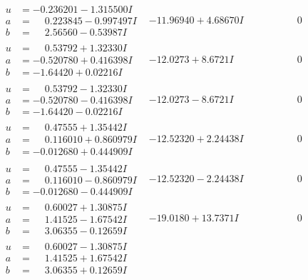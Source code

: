 \documentclass[1p]{elsarticle_modified}
\theoremstyle{definition}
\begin{document}
$$\begin{array}{c|c|c}
\begin{aligned}
u &= -0.236201 - 1.315500 I \\
a &= \phantom{-}0.223845 - 0.997497 I \\
b &= \phantom{-}2.56560 - 0.53987 I\end{aligned}
 & -11.96940 + 4.68670 I & \phantom{-0.000000 } 0 \\ \hline\begin{aligned}
u &= \phantom{-}0.53792 + 1.32330 I \\
a &= -0.520780 + 0.416398 I \\
b &= -1.64420 + 0.02216 I\end{aligned}
 & -12.0273 + 8.6721 I & \phantom{-0.000000 } 0 \\ \hline\begin{aligned}
u &= \phantom{-}0.53792 - 1.32330 I \\
a &= -0.520780 - 0.416398 I \\
b &= -1.64420 - 0.02216 I\end{aligned}
 & -12.0273 - 8.6721 I & \phantom{-0.000000 } 0 \\ \hline\begin{aligned}
u &= \phantom{-}0.47555 + 1.35442 I \\
a &= \phantom{-}0.116010 + 0.860979 I \\
b &= -0.012680 + 0.444909 I\end{aligned}
 & -12.52320 + 2.24438 I & \phantom{-0.000000 } 0 \\ \hline\begin{aligned}
u &= \phantom{-}0.47555 - 1.35442 I \\
a &= \phantom{-}0.116010 - 0.860979 I \\
b &= -0.012680 - 0.444909 I\end{aligned}
 & -12.52320 - 2.24438 I & \phantom{-0.000000 } 0 \\ \hline\begin{aligned}
u &= \phantom{-}0.60027 + 1.30875 I \\
a &= \phantom{-}1.41525 - 1.67542 I \\
b &= \phantom{-}3.06355 - 0.12659 I\end{aligned}
 & -19.0180 + 13.7371 I & \phantom{-0.000000 } 0 \\ \hline\begin{aligned}
u &= \phantom{-}0.60027 - 1.30875 I \\
a &= \phantom{-}1.41525 + 1.67542 I \\
b &= \phantom{-}3.06355 + 0.12659 I\end{aligned}

\end{array}$$
\end{document}
